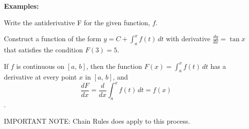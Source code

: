 \documentclass[addpoints, 12pt]{exam}
\begin{document}
\textbf{Examples:}
\begin{questions}
    \question Write the antiderivative F for the given function, $f$.
    
    
    \question Construct a function of the form $y=\displaystyle C+ \int_a^x f(t)\,dt$ with derivative $\displaystyle\frac{dy}{dx}=\tan x$ that satisfies the condition $F(3)=5.$
    
\end{questions}

\newpage

\begin{tcolorbox}[title= DERIVATIVE OF THE INTEGRAL, black,sharp corners,colback=white,colbacktitle=white,coltitle=black,boxrule=1pt]

     If $f$ is continuous on $[a,\,b]$, then the function $\displaystyle F(x)=\int_a^x f(t)\,dt$ has a derivative at every point $x$ in $[a,\,b]$, and
     \[\frac{dF}{dx}=\frac{d}{dx}\int_a^x f(t)\,dt=f(x)\].
    
\end{tcolorbox}
\begin{center}
    IMPORTANT NOTE: Chain Rules does apply to this process.
\end{center}
\end{document}
